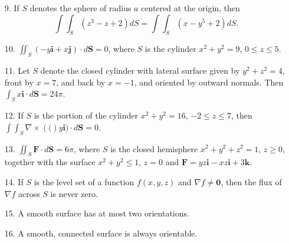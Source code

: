 \documentclass[11pt,letterpaper,boxed]{hmcpset}
\newcommand{\pn}[1]{\left( #1 \right)}
\newcommand{\VEC}[1]{\ensuremath{\mathbf{#1}}\xspace}
\begin{document}
\begin{problem}
\begin{enumerate}
\item[9.] If $S$ denotes the sphere of radius $a$ centered at the origin, then 
\[
	\int\int_S\pn{z^3-z+2}dS = \int\int_S\pn{x-y^5+2}dS.
\]
\item[10.] $\iint_S\pn{-y\VEC{i}+x\VEC{j}}\cdot d\VEC{S}=0$, where $S$ is the cylinder $x^2+y^2=9$, $0\leq z\leq5.$
\item[11.] Let $S$ denote the closed cylinder with lateral surface given by $y^2+z^2=4$, front by $x=7$, and back by $x=-1$, and oriented
by outward normals. Then $\int_Sx\VEC{i}\cdot d\VEC{S}=24\pi$.
\item[12.] If $S$ is the portion of the cylinder $x^2+y^2=16$, $-2\leq z\leq7$, then $\int\int_S \nabla\times\pn(y\VEC{i})\cdot d\VEC{S}=0$.
\item[13.] $\iint_S\VEC{F}\cdot d\VEC{S}=6\pi$, where $S$ is the closed hemisphere $x^2+y^2+z^2=1$, $z\geq0$, together with the surface $x^2+y^2\leq1$, $z=0$ and
$\VEC{F} = yz\VEC{i}-xz\VEC{i}+3\VEC{k}$.
\item[14.] If $S$ is the level set of a function $f(x,y,z)$ and $\nabla f\neq\VEC{0}$, then the flux of $\nabla f$ across $S$ is never zero.
\item[15.] A smooth surface has at most two orientations.
\item[16.] A smooth, connected surface is always orientable.
\end{enumerate}

\end{problem}

\begin{solution}
\vfill
\end{solution}
\newpage
\end{document}
